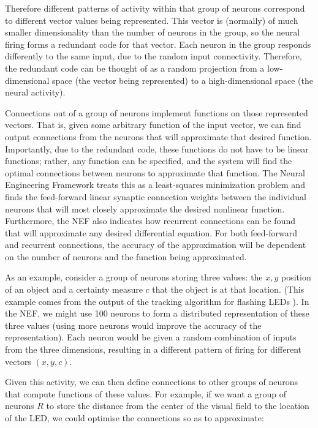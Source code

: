 \documentclass[conference]{IEEEtran}
\begin{document}
Therefore different patterns of activity within
that group of neurons correspond to different vector values being represented.
This vector is (normally) of much smaller dimensionality than the number of 
neurons in the group, so the neural firing forms a redundant code for that 
vector. Each neuron in the group responds differently to the same input, due
to the random input connectivity. Therefore, the redundant code can be thought of as a 
random projection from a low-dimensional space (the vector being represented) 
to a high-dimensional space (the neural activity). 

Connections out of a group of neurons implement functions on those represented 
vectors. That is, given some arbitrary function of the input vector, we can
find output connections from the neurons that will approximate that desired
function.  Importantly, due to 
the redundant code, these functions do not have to be linear functions; 
rather, any function can be specified, and the system will find the optimal
connections between neurons to approximate that function. The Neural Engineering 
Framework treats this as a least-squares minimization problem and finds the 
feed-forward linear synaptic connection weights between the individual neurons that will 
most closely approximate the desired nonlinear function. Furthermore, the NEF 
also indicates how recurrent connections can be found that will approximate 
any desired differential equation.  For both feed-forward and recurrent 
connections, the accuracy of the approximation will be dependent on the 
number of neurons and the function being approximated. 

As an example, consider a group of neurons storing three values: the $x,y$ 
position of an object and a certainty measure $c$ that the object is at that
location.  (This example comes from the output of the tracking algorithm 
for flashing LEDs \cite{muller2011miniature}).  In the NEF, we might use 100 
neurons to form a distributed representation of these three values 
(using more neurons would improve the accuracy of the representation).  Each
neuron would be given a random combination of inputs from the three dimensions,
resulting in a different pattern of firing for different vectors $(x,y,c)$.

Given this activity, we can then define connections to other groups of neurons
that compute functions of these values. For example, if we want a group of 
neurons $R$ to store the distance from the center of the visual field to the 
location of the LED, we could optimise the connections so
as to approximate: 
 
\end{document}
